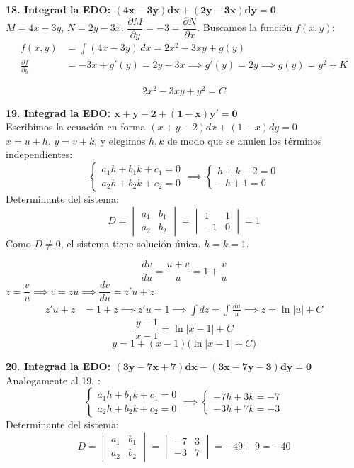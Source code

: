 \documentclass[11pt, a4paper]{article}
\begin{document}
\noindent\textbf{18. Integrad la EDO: $\bm{(4x-3y)dx + (2y-3x)dy = 0}$} \\
$M=4x-3y$, $N=2y-3x$. $\dfrac{\partial M}{\partial y} = -3 = \dfrac{\partial N}{\partial x}$. Buscamos la función $f(x,y)$:
\begin{align*}
f(x,y) &= \int (4x-3y)\, dx = 2x^2 - 3xy + g(y) \\
\frac{\partial f}{\partial y} &= -3x + g'(y) = 2y - 3x \implies g'(y) = 2y \implies g(y) = y^2 +K
\end{align*}

\[
\boxed{2x^2 - 3xy + y^2 = C}
\]


\noindent\textbf{19. Integrad la EDO: $\bm{x+y-2 + (1-x)y' = 0}$} \\
Escribimos la ecuación en forma $(x+y-2)dx + (1-x)dy = 0$\\
$x=u+h$, $y=v+k$, y elegimos $h,k$ de modo que se anulen los términos independientes:
\[
\begin{cases} a_1 h + b_1 k + c_1 = 0 \\ a_2 h + b_2 k + c_2 = 0 \end{cases}
\implies
\begin{cases} h + k - 2 = 0 \\ -h + 1 = 0 \end{cases}
\]
Determinante del sistema:
\[
D = \begin{vmatrix} a_1 & b_1 \\ a_2 & b_2 \end{vmatrix} = \begin{vmatrix} 1 & 1 \\ -1 & 0 \end{vmatrix} = 1
\]
Como $D\neq 0$, el sistema tiene solución única. $h=k=1$.

\[
\frac{dv}{du} = \frac{u+v}{u} = 1+\frac{v}{u}
\]
$z = \dfrac{v}{u} \implies v=zu \implies \dfrac{dv}{du}=z'u+z$.
\begin{align*}
z'u+z &= 1+z \implies z'u = 1 \implies \int dz = \int \frac{du}{u} \implies z = \ln|u| + C
\end{align*}
\[
\frac{y-1}{x-1} = \ln|x-1| + C
\]
\[
\boxed{y = 1 + (x-1)\big(\ln|x-1| + C\big)}
\]


\noindent\textbf{20. Integrad la EDO: $\bm{(3y-7x+7)dx - (3x-7y-3)dy = 0}$} \\
Analogamente al 19. :
\[
\begin{cases} a_1 h + b_1 k + c_1 = 0 \\ a_2 h + b_2 k + c_2 = 0 \end{cases}
\implies
\begin{cases} -7h + 3k = -7 \\ -3h + 7k = -3 \end{cases}
\]
Determinante del sistema:
\[
D = \begin{vmatrix} a_1 & b_1 \\ a_2 & b_2 \end{vmatrix} = \begin{vmatrix} -7 & 3 \\ -3 & 7 \end{vmatrix} = -49+9 = -40
\]
\end{document}
